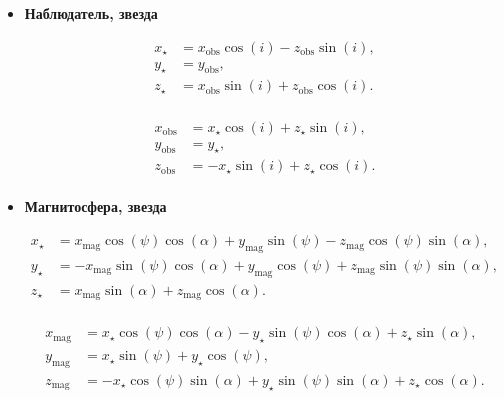 \documentclass[12pt]{article}
\begin{document}
\begin{itemize}
\item \textbf{Наблюдатель, звезда}

\begin{equation}\label{eq:obs-to-star}
\begin{aligned}
x_\star &= x_\text{obs} \cos(i) - z_\text{obs}\sin(i), \\
y_\star &= y_\text{obs}, \\
z_\star &= x_\text{obs} \sin(i) + z_\text{obs}\cos(i). \\
\end{aligned}
\end{equation}

\begin{equation}\label{eq:star-to-obs}
\begin{aligned}
x_\text{obs} &= x_\star \cos(i) + z_\star\sin(i), \\
y_\text{obs} &= y_\star, \\
z_\text{obs} &= -x_\star \sin(i) + z_\star\cos(i). \\
\end{aligned}
\end{equation}

\item \textbf{Магнитосфера, звезда}

\begin{equation}\label{eq:mag-to-star}
\begin{aligned}
x_\star &= x_\text{mag} \cos(\psi)\cos(\alpha) + y_\text{mag}\sin(\psi) - z_\text{mag}\cos(\psi)\sin(\alpha), \\
y_\star &= - x_\text{mag}\sin(\psi)\cos(\alpha) + y_\text{mag}\cos(\psi) + z_\text{mag}\sin(\psi)\sin(\alpha),  \\
z_\star &= x_\text{mag} \sin(\alpha) + z_\text{mag}\cos(\alpha). \\
\end{aligned}
\end{equation}

\begin{equation}\label{eq:star-to-mag}
\begin{aligned}
x_\text{mag} &= x_\star \cos(\psi)\cos(\alpha) - y_\star\sin(\psi)\cos(\alpha) + z_\star\sin(\alpha), \\
y_\text{mag} &= x_\star\sin(\psi) + y_\star\cos(\psi),  \\
z_\text{mag} &= -x_\star\cos(\psi)\sin(\alpha) + y_\star\sin(\psi)\sin(\alpha) + z_\star\cos(\alpha). \\
\end{aligned}
\end{equation}


\end{itemize}
\end{document}
